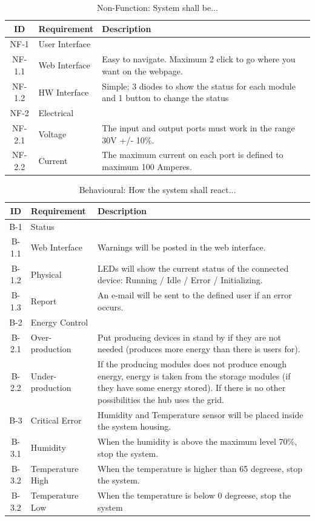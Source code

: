 		\begin{table}[H]
			\begin{tabular} [b] {| c |  p{3cm} | p{10cm} |}
			\hline
			\textbf{ID} & \textbf{Requirement} & \textbf{Description} \\\hline
			NF-1 & User Interface 	&  \\ \hline
			NF-1.1 & Web Interface 	& Easy to navigate. Maximum 2 click to go where you want on the webpage. \\ \hline
			NF-1.2 & HW Interface 	& Simple; 3 diodes to show the status for each module and 1 button to change the status \\ \hline
			NF-2 & Electrical 		&  \\ \hline
			NF-2.1 & Voltage 		& The input and output ports must work in the range 30V +/-  10\%.\\ \hline
			NF-2.2 & Current 		& The maximum current on each port is defined to maximum 100 Amperes. \\ \hline
		\end{tabular}
		\caption{Non-Function: System shall be...}
		\end{table}

		\begin{table}[H]
			\begin{tabular} [b] {| c |  p{3cm} | p{10cm} |}
			\hline
			\textbf{ID} & \textbf{Requirement} & \textbf{Description} \\\hline
			B-1 & Status &  \\\hline
			B-1.1 & Web Interface 	 & Warnings will be posted in the web interface. \\\hline
			B-1.2 & Physical 		 & LEDs will show the current status of the connected device: Running / Idle / Error / Initializing. \\\hline
			B-1.3 & Report 			 & An e-mail will be sent to the defined user if an error occurs. \\\hline
			B-2 & Energy Control 	 &  \\\hline
			B-2.1 & Over-production 	 & Put producing devices in stand by if they are not needed (produces more energy than there is users for). \\\hline
			B-2.2 & Under-production  & If the producing modules does not produce enough energy, energy is taken from the storage
				      modules (if they have some energy stored). If there is no other possibilities the hub uses the grid. \\\hline
			B-3 & Critical Error 		& Humidity and Temperature sensor will be placed inside the system housing. \\\hline
			B-3.1 & Humidity 		 & When the humidity is above the maximum level 70\%, stop the system. \\\hline
			B-3.2 & Temperature High& When the temperature is higher than 65 degreese,  stop the system.\\\hline
			B-3.2 & Temperature Low & When the temperature is below 0 degreese, stop the system\\\hline
		\end{tabular}
		\caption{Behavioural: How the system shall react...}
		\end{table}
		
